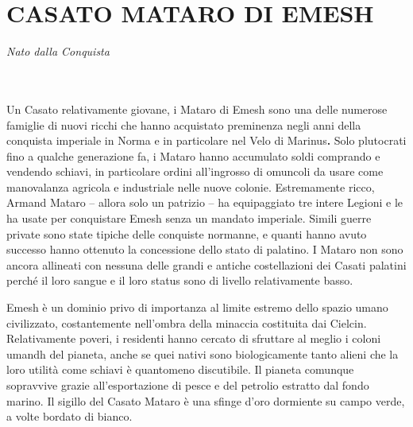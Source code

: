 \section{CASATO MATARO DI EMESH}

\begin{center}
	\emph{Nato dalla Conquista}
\end{center}
\leavevmode\\
\leavevmode\\
Un Casato relativamente giovane, i Mataro di Emesh sono una delle
numerose famiglie di nuovi ricchi che hanno acquistato preminenza negli
anni della conquista imperiale in Norma e in particolare nel Velo di
Marinus\textbf{.} Solo plutocrati fino a qualche generazione fa, i
Mataro hanno accumulato soldi comprando e vendendo schiavi, in
particolare ordini all'ingrosso di omuncoli da usare come manovalanza
agricola e industriale nelle nuove colonie. Estremamente ricco, Armand
Mataro -- allora solo un patrizio -- ha equipaggiato tre intere Legioni
e le ha usate per conquistare Emesh senza un mandato imperiale. Simili
guerre private sono state tipiche delle conquiste normanne, e quanti
hanno avuto successo hanno ottenuto la concessione dello stato di
palatino. I Mataro non sono ancora allineati con nessuna delle grandi e
antiche costellazioni dei Casati palatini perché il loro sangue e il
loro status sono di livello relativamente basso.

Emesh è un dominio privo di importanza al limite estremo dello spazio
umano civilizzato, costantemente nell'ombra della minaccia costituita
dai Cielcin. Relativamente poveri, i residenti hanno cercato di
sfruttare al meglio i coloni umandh del pianeta, anche se quei nativi
sono biologicamente tanto alieni che la loro utilità come schiavi è
quantomeno discutibile. Il pianeta comunque sopravvive grazie
all'esportazione di pesce e del petrolio estratto dal fondo marino. Il
sigillo del Casato Mataro è una sfinge d'oro dormiente su campo verde, a
volte bordato di bianco.


